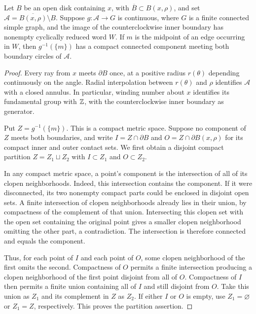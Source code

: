 \begin{lemma}
\label{lem:interfaces-annular-crossing}
Let $B$ be an open disk containing $x$, with
$\overline B\subset B(x,\rho)$, and set
$\mathcal A=\overline{B(x,\rho)}\setminus B$.
Suppose $g:\mathcal A\to G$ is continuous, where $G$ is a finite
connected simple graph, and the image of the counterclockwise inner
boundary has nonempty cyclically reduced word $W$.  If $m$ is the
midpoint of an edge occurring in $W$, then $g^{-1}(\{m\})$ has a
compact connected component meeting both boundary circles of
$\mathcal A$.
\end{lemma}

\begin{proof}
Every ray from $x$ meets $\partial B$ once, at a positive radius
$r(\theta)$ depending continuously on the angle.  Radial interpolation
between $r(\theta)$ and $\rho$ identifies $\mathcal A$ with a closed
annulus.  In particular, winding number about $x$ identifies its
fundamental group with $\mathbb Z$, with the counterclockwise inner boundary
as generator.

Put $Z=g^{-1}(\{m\})$.  This is a compact metric space.  Suppose no
component of $Z$ meets both boundaries, and write
$I=Z\cap\partial B$ and $O=Z\cap\partial B(x,\rho)$ for its compact
inner and outer contact sets.  We first obtain a disjoint compact partition
$Z=Z_1\sqcup Z_2$ with $I\subset Z_1$ and $O\subset Z_2$.

In any compact metric space, a point's component is the intersection
of all of its clopen neighborhoods.  Indeed, this intersection
contains the component.  If it were disconnected, its two nonempty
compact parts could be enclosed in disjoint open sets.  A finite
intersection of clopen neighborhoods already lies in their union,
by compactness of the complement of that union.  Intersecting this
clopen set with the open set containing the original point gives
a smaller clopen neighborhood omitting the other part, a
contradiction.  The intersection is therefore connected and equals
the component.

Thus, for each point of $I$ and each point of $O$, some clopen
neighborhood of the first omits the second.  Compactness of $O$
permits a finite intersection producing a clopen neighborhood of
the first point disjoint from all of $O$.  Compactness of $I$
then permits a finite union containing all of $I$ and still
disjoint from $O$.  Take this union as $Z_1$ and its complement in
$Z$ as $Z_2$.  If either $I$ or $O$ is empty, use $Z_1=\varnothing$
or $Z_1=Z$, respectively.  This proves the partition assertion.


\end{proof}
